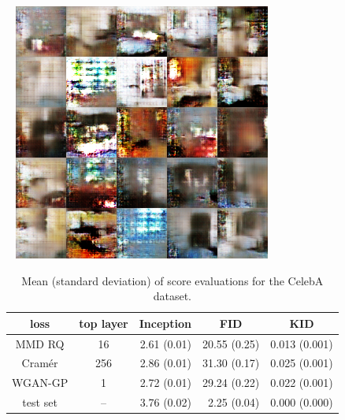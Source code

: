 \documentclass[xcolor={table}]{beamer}
\begin{document}
\begin{frame}{}
\begin{columns}[T, totalwidth=\textwidth]
\begin{column}{.32\textwidth}
\begin{sidefigure4}
      ~
      \includegraphics[width=.49\columnwidth]{samples/lsun_wgan_16.png}
      \caption{\textbf{$160 \times 160$ CelebA dataset.} \\
               Samples from
               MMD GAN (left) and WGAN-GP (right) trained with ResNet generator and DCGAN critic.\\
               \vspace*{95pt}
               \textbf{$64 \times 64$ LSUN bedroom dataset.}\\
               Samples from 
               MMD GAN (left) and WGAN-GP (right) models trained with DCGAN 
               architecture with \emph{small} critic.%
               }
    \end{sidefigure4}
    \vspace*{-1.3cm}
    \begin{table}
      \centering
      \vspace{-1cm}
      \caption{Mean (standard deviation) of score evaluations for the CelebA dataset.}
      \label{tab:celeba-scores}
      \begin{tabular}{cc|rrr}
        loss & top layer & \multicolumn{1}{c}{Inception} & \multicolumn{1}{c}{FID} & \multicolumn{1}{c}{KID} \\
        \hline
        MMD RQ   &   16 &    2.61  (0.01) &   20.55  (0.25) &   0.013  (0.001)\\
        Cram\'er &  256 &    2.86  (0.01) &   31.30  (0.17) &   0.025  (0.001)\\
        WGAN-GP  & 1    &    2.72  (0.01) &   29.24  (0.22) &   0.022  (0.001)\\
        test set & --   &    3.76  (0.02) &    2.25  (0.04) &   0.000  (0.000)\\
    \end{tabular}
\end{table}
  \end{column}


\end{columns}
\end{frame}
\end{document}
